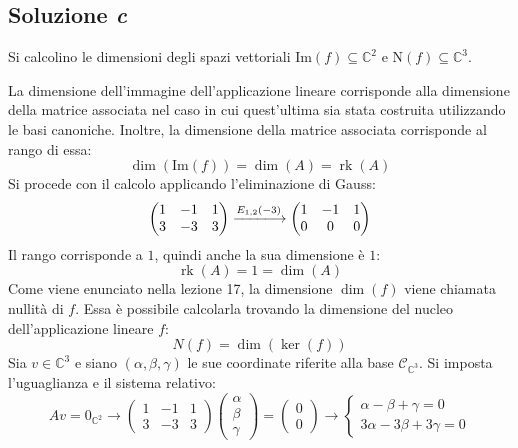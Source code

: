\documentclass[a4paper]{article}
\DeclareMathOperator{\rk}{rk}
\begin{document}
	\subsection{Soluzione \emph{c}}
	
	Si calcolino le dimensioni degli spazi vettoriali $\mathrm{Im}\left(f\right) \subseteq \mathbb{C}^{2}$ e $\mathrm{N}\left(f\right) \subseteq \mathbb{C}^{3}$.\newline
	
	\noindent
	La dimensione dell'immagine dell'applicazione lineare corrisponde alla dimensione della matrice associata nel caso in cui quest'ultima sia stata costruita utilizzando le basi canoniche. Inoltre, la dimensione della matrice associata corrisponde al rango di essa:
	\begin{equation*}
		\dim\left(\mathrm{Im}\left(f\right)\right) = \dim\left(A\right) = \rk\left(A\right)
	\end{equation*}
	Si procede con il calcolo applicando l'eliminazione di Gauss:
	\begin{equation*}
		\begin{pmatrix}
			1 & -1 & 1 \\
			3 & -3 & 3
		\end{pmatrix} \xlongrightarrow{E_{1,2}\left(-3\right)}
		\begin{pmatrix}
			1 & -1 & 1 \\
			0 &  0 & 0
		\end{pmatrix}
	\end{equation*}
	Il rango corrisponde a $1$, quindi anche la sua dimensione è $1$:
	\begin{equation*}
		\rk\left(A\right) = 1 = \dim\left(A\right)
	\end{equation*}
	Come viene enunciato nella lezione 17, la dimensione $\dim\left(f\right)$ viene chiamata nullità di $f$. Essa è possibile calcolarla trovando la dimensione del nucleo dell'applicazione lineare $f$:
	\begin{equation*}
		N\left(f\right) = \dim\left(\ker\left(f\right)\right)
	\end{equation*}
	Sia $v \in \mathbb{C}^{3}$ e siano $\left(\alpha, \beta, \gamma\right)$ le sue coordinate riferite alla base $\mathcal{C}_{\mathbb{C}^{3}}$. Si imposta l'uguaglianza e il sistema relativo:
	\begin{equation*}
		Av = 0_{\mathbb{C}^{2}} \longrightarrow
		\begin{pmatrix}
			1 & -1 & 1 \\
			3 & -3 & 3
		\end{pmatrix}
		\begin{pmatrix}
			\alpha \\ \beta \\ \gamma
		\end{pmatrix} =
		\begin{pmatrix}
			0 \\ 0
		\end{pmatrix} \longrightarrow
		\begin{cases}
			\alpha -\beta + \gamma = 0 \\
			3\alpha -3\beta +3 \gamma = 0
		\end{cases}
	\end{equation*}
\end{document}
